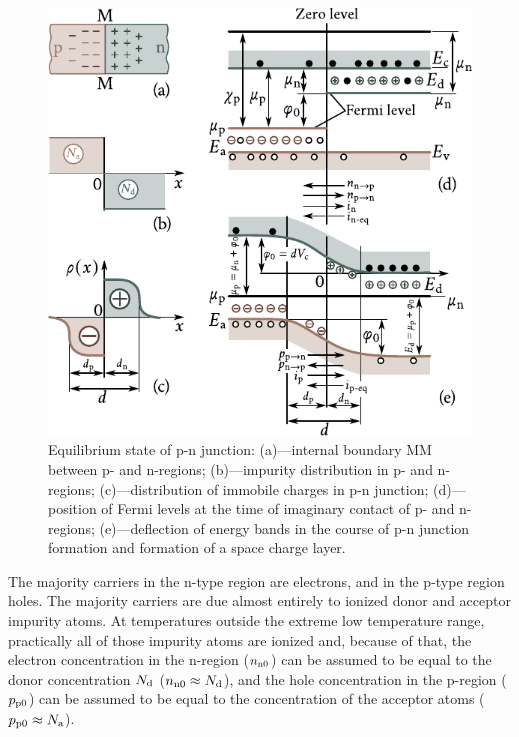 \begin{figure}[t]
	\begin{center}
		\includegraphics[scale=1.1]{figures/ch_08/fig_8_12.pdf}
		\caption[]{Equilibrium state of p-n junction: (a)---internal boundary MM between p- and n-regions; (b)---impurity distribution in p- and n-regions; (c)---distribution of immobile charges in p-n junction; (d)---position of Fermi levels at the time of imaginary contact of p- and n-regions; (e)---deflection of energy bands in the course of p-n junction formation and formation of a space charge layer.}
		\label{fig:8_12}
	\end{center}
	\vspace{-0.8cm}
\end{figure}

The majority carriers in the n-type region are electrons, and in the p-type region holes. The majority carriers are due almost entirely to ionized donor and acceptor impurity atoms. At temperatures
outside the extreme low temperature range, practically all of those impurity atoms are ionized and, because of that, the electron concentration in the n-region ($n_{\text{n$0$}}$) can be assumed to be equal to the donor concentration $N_{\text{d}}$ ($n_{\text{n$0$}}\approx N_{\text{d}}$), and the hole concentration in the p-region ($p_{\text{p$0$}}$) can be assumed to be equal to the concentration
of the acceptor atoms ($p_{\text{p$0$}}\approx N_{\text{a}}$).

